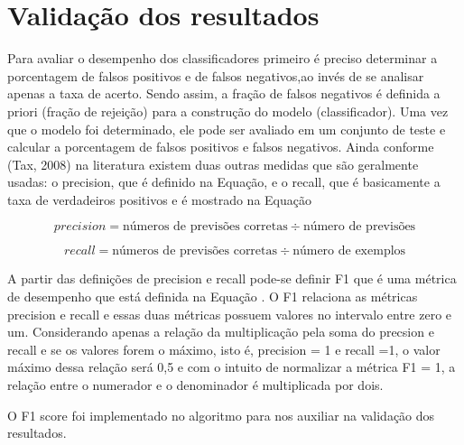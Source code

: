 \section{\textbf{Validação dos resultados}}

Para avaliar o desempenho dos classificadores primeiro é preciso determinar a porcentagem de falsos positivos e de falsos negativos,ao invés de se analisar apenas a taxa de acerto. Sendo assim, a fração de falsos negativos é definida a priori (fração de rejeição) para a construção do modelo (classificador).
Uma vez que o modelo foi determinado, ele pode ser avaliado em um conjunto de teste e calcular a porcentagem de falsos positivos e falsos negativos. Ainda conforme (Tax, 2008) na literatura existem duas outras medidas que são geralmente usadas: o precision, que é definido na Equação, e o recall, que é basicamente a taxa de verdadeiros positivos e é mostrado na Equação 

\[precision= \text {números de previsões corretas}\div{\text {número de previsões}}\]

\[recall= \text {números de previsões corretas}\div{\text {número de exemplos}}\]


A partir das definições de precision e recall pode-se definir F1 que é uma métrica de
desempenho que está definida na Equação . O F1 relaciona as métricas precision e recall
e essas duas métricas possuem valores no intervalo entre zero e um. Considerando apenas a
relação da multiplicação pela soma do precsion e recall e se os valores forem o máximo, isto
é, precision = 1 e recall =1, o valor máximo dessa relação será 0,5 e com o intuito de
normalizar a métrica F1 = 1, a relação entre o numerador e o denominador é multiplicada por
dois. 

O F1 score foi implementado no algoritmo para nos auxiliar na validação dos resultados\cite{lombardi}. 



